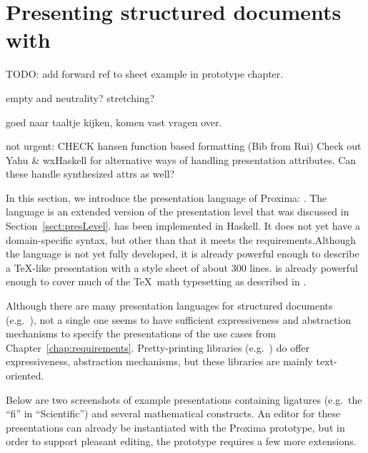 \chapter{Presenting structured documents with {\Xprez}} \label{chap:presenting}



\bc
TODO:
add forward ref to sheet example in prototype chapter.



empty and neutrality? stretching?

goed naar taaltje kijken, komen vast vragen over.

not urgent:
CHECK hansen function based formatting (Bib from Rui)
Check out  Yahu & wxHaskell for alternative ways of handling presentation attributes. Can these handle synthesized attrs as well?
\ec








In this section, we introduce the presentation language of Proxima: {\Xprez}. The language is an extended version of the presentation level that was discussed in Section~\ref{sect:presLevel}. {\Xprez}  has been implemented in Haskell. \bc It does not yet have a domain-specific syntax, but other than that it meets the requirements.\ec Although the language is not yet fully developed, it \bc is already powerful enough to describe a \TeX -like presentation with a style sheet of about 300 lines. \ec
 is already powerful enough to cover much of the \TeX~math typesetting as described in \cite{heckmann97functionalTex}. 


Although there are many presentation languages for structured documents (e.g.\ \cite{css2, badros99ccss, marden98psl, xsl10, quint97thot}), not a single one seems to have sufficient expressiveness and abstraction mechanisms to specify the presentations of the use cases from Chapter~\ref{chap:requirements}. Pretty-printing libraries (e.g.\ \cite{oppen80prettyPrinting, swierstra98combinators, hughes1995prettyPrinting, kahl99galleyCombs, brand96generationOfFormatters}) do offer expressiveness, abstraction mechanisms, but these libraries are mainly text-oriented. 

 
Below are two screenshots of example {\Xprez} presentations containing ligatures (e.g.\ the ``fi'' in ``Scientific'') and several mathematical constructs. An editor for these presentations can already be instantiated with the Proxima prototype, but in order to support pleasant editing, the prototype requires a few more extensions.

